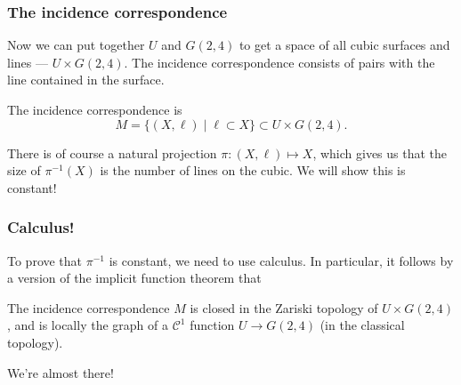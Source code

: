 \documentclass[mathserif, xcolor = dvipsnames]{beamer}
\begin{document}
\begin{frame}
	\frametitle{The incidence correspondence}

	Now we can put together $U$ and $G(2, 4)$ to get a space of all cubic surfaces and lines --- $U \times G(2, 4)$. The incidence correspondence consists of pairs with the line contained in the surface. \pause

	\begin{definition}
		The incidence correspondence is
		\[
			M = \{ (X, \ell) \mid \ell \subset X \} \subset U \times G(2, 4).
		\]
	\end{definition}

	There is of course a natural projection $\pi : (X, \ell) \mapsto X$, which gives us that the size of $\pi^{-1}(X)$ is the number of lines on the cubic. We will show this is constant!
\end{frame}

\begin{frame}
	\frametitle{Calculus!}

	To prove that $\pi^{-1}$ is constant, we need to use calculus. In particular, it follows by a version of the implicit function theorem that
	\begin{lemma}
		The incidence correspondence $M$ is closed in the Zariski topology of $U \times G(2, 4)$, and is locally the graph of a $\mathcal{C}^{1}$ function $U \to G(2, 4)$ (in the classical topology).
	\end{lemma}
	\pause

	We're almost there!
\end{frame}
\end{document}
